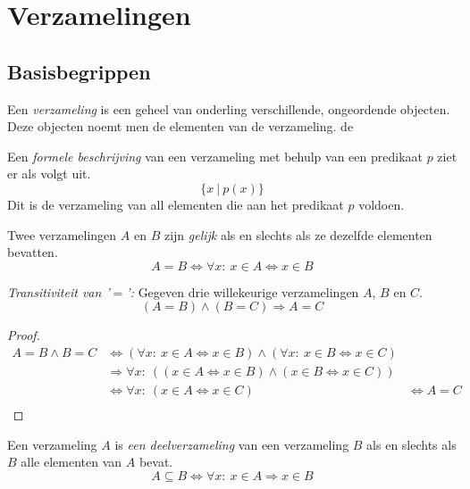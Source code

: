 \documentclass[main.tex]{subfiles}
\begin{document}
\chapter{Verzamelingen}
\label{cha:verzamelingen}

\section{Basisbegrippen}
\label{sec:basisbegrippen}

\begin{de}
  Een \emph{verzameling} is een geheel van onderling verschillende, ongeordende objecten. Deze objecten noemt men de elementen van de verzameling.
de 
\end{de}

\begin{de}
  Een \emph{formele beschrijving} van een verzameling met behulp van een predikaat $p$ ziet er als volgt uit.
  \[ \{x\ |\ p(x)\} \]
  Dit is de verzameling van all elementen die aan het predikaat $p$ voldoen.
\end{de}

\begin{de}
  Twee verzamelingen $A$ en $B$ zijn \emph{gelijk} als en slechts als ze dezelfde elementen bevatten. 
  \[ A = B \Leftrightarrow \forall x:\ x \in A \Leftrightarrow x \in B \]
\end{de}

\begin{st}
  \emph{Transitiviteit van '$=$':} Gegeven drie willekeurige verzamelingen $A$, $B$ en $C$.
  \[ (A = B) \wedge (B = C) \Rightarrow A = C \]
  \begin{proof}
    \[
    \begin{array}{cll}
      A = B \wedge B = C &\Leftrightarrow (\forall x:\ x \in A \Leftrightarrow x \in B) \wedge (\forall x:\ x \in B \Leftrightarrow x \in C) &\\
      &\Rightarrow \forall x:\ ((x \in A \Leftrightarrow x \in B) \wedge (x \in B \Leftrightarrow x \in C)) &\\
      &\Leftrightarrow \forall x:\ (x \in A \Leftrightarrow x \in C) &\Leftrightarrow  A = C\\
    \end{array}
    \]
  \end{proof}
\end{st}

\begin{de}
  Een verzameling $A$ is \emph{een deelverzameling} van een verzameling $B$ als en slechts als $B$ alle elementen van $A$ bevat.
  \[ A \subseteq B \Leftrightarrow \forall x:\ x \in A \Rightarrow x \in B\]
\end{de}
\end{document}
